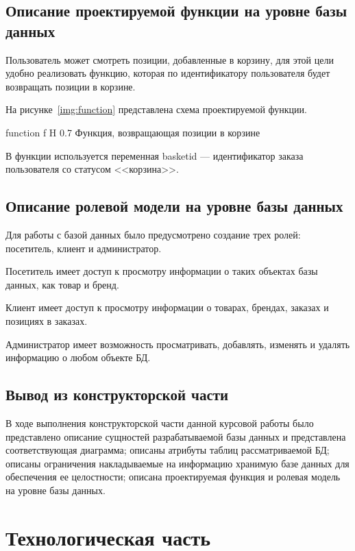 \documentclass{bmstu}
\begin{document}
\section{Описание проектируемой функции на уровне базы данных}

Пользователь может смотреть позиции, добавленные в корзину, для этой цели удобно реализовать функцию, которая по идентификатору пользователя будет возвращать позиции в корзине.

На рисунке~\ref{img:function} представлена схема проектируемой функции.

    {function}
    {f}
    {H}
    {0.7\textwidth}
    {Функция, возвращающая позиции в корзине}

В функции используется переменная basket\textunderscore id --- идентификатор заказа пользователя со статусом <<корзина>>.

\section{Описание ролевой модели на уровне базы данных}

Для работы с базой данных было предусмотрено создание трех ролей: посетитель, клиент и администратор.

Посетитель имеет доступ к просмотру информации о таких объектах базы данных, как товар и бренд.

Клиент имеет доступ к просмотру информации о товарах, брендах, заказах и позициях в заказах.

Администратор имеет возможность просматривать, добавлять, изменять и удалять информацию о любом объекте БД.

\section*{Вывод из конструкторской части}

В ходе выполнения конструкторской части данной курсовой работы было представлено описание сущностей разрабатываемой базы данных и представлена соответствующая диаграмма; описаны атрибуты таблиц рассматриваемой БД; описаны ограничения накладываемые на информацию хранимую базе данных для обеспечения ее целостности; описана проектируемая функция и ролевая модель на уровне базы данных.

\chapter{Технологическая часть}
\end{document}
